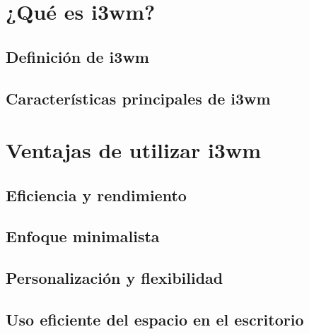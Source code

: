 \documentclass[
  a4paper,
]{article}
\author{Edison Achalma}
\date{}
\begin{document}
\ifdefined\Shaded\renewenvironment{Shaded}{\begin{tcolorbox}[boxrule=0pt, breakable, interior hidden, borderline west={3pt}{0pt}{shadecolor}, frame hidden, enhanced, sharp corners]}{\end{tcolorbox}}\fi

\hypertarget{quuxe9-es-i3wm}{%
\section{¿Qué es i3wm?}\label{quuxe9-es-i3wm}}

\hypertarget{definiciuxf3n-de-i3wm}{%
\subsection{Definición de i3wm}\label{definiciuxf3n-de-i3wm}}

\hypertarget{caracteruxedsticas-principales-de-i3wm}{%
\subsection{Características principales de
i3wm}\label{caracteruxedsticas-principales-de-i3wm}}

\hypertarget{ventajas-de-utilizar-i3wm}{%
\section{Ventajas de utilizar i3wm}\label{ventajas-de-utilizar-i3wm}}

\hypertarget{eficiencia-y-rendimiento}{%
\subsection{Eficiencia y rendimiento}\label{eficiencia-y-rendimiento}}

\hypertarget{enfoque-minimalista}{%
\subsection{Enfoque minimalista}\label{enfoque-minimalista}}

\hypertarget{personalizaciuxf3n-y-flexibilidad}{%
\subsection{Personalización y
flexibilidad}\label{personalizaciuxf3n-y-flexibilidad}}

\hypertarget{uso-eficiente-del-espacio-en-el-escritorio}{%
\subsection{Uso eficiente del espacio en el
escritorio}\label{uso-eficiente-del-espacio-en-el-escritorio}}
\end{document}
